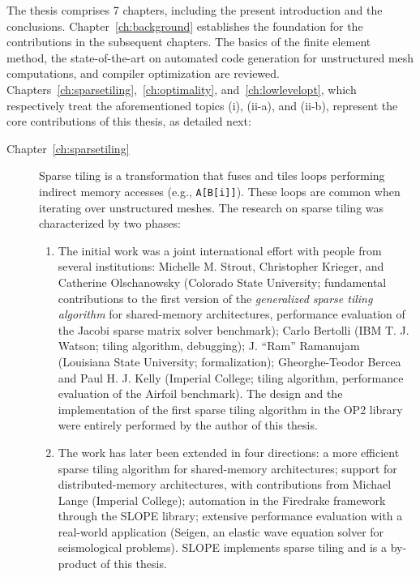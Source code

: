 The thesis comprises 7 chapters, including the present introduction and the conclusions. Chapter~\ref{ch:background} establishes the foundation for the contributions in the subsequent chapters. The basics of the finite element method, the state-of-the-art on automated code generation for unstructured mesh computations, and compiler optimization are reviewed. Chapters~\ref{ch:sparsetiling},~\ref{ch:optimality}, and~\ref{ch:lowlevelopt}, which respectively treat the aforementioned topics (i), (ii-a), and (ii-b), represent the core contributions of this thesis, as detailed next:

\begin{description}
\item[Chapter~\ref{ch:sparsetiling}] Sparse tiling is a transformation that fuses and tiles loops performing indirect memory accesses (e.g., {\tt A[B[i]]}). These loops are common when iterating over unstructured meshes. The research on sparse tiling was characterized by two phases:
\begin{enumerate}
\item The initial work was a joint international effort with people from several institutions: Michelle M. Strout, Christopher Krieger, and Catherine Olschanowsky (Colorado State University; fundamental contributions to the first version of the {\em generalized sparse tiling algorithm} for shared-memory architectures, performance evaluation of the Jacobi sparse matrix solver benchmark); Carlo Bertolli (IBM T. J. Watson; tiling algorithm, debugging); J. ``Ram'' Ramanujam (Louisiana State University; formalization); Gheorghe-Teodor Bercea and Paul H. J. Kelly (Imperial College; tiling algorithm, performance evaluation of the Airfoil benchmark). The design and the implementation of the first sparse tiling algorithm in the OP2 library were entirely performed by the author of this thesis. 
\item The work has later been extended in four directions: a more efficient sparse tiling algorithm for shared-memory architectures; support for distributed-memory architectures, with contributions from Michael Lange (Imperial College); automation in the Firedrake framework through the SLOPE library; extensive performance evaluation with a real-world application (Seigen, an elastic wave equation solver for seismological problems). SLOPE implements sparse tiling and is a by-product of this thesis.
\end{enumerate}


\end{description}
